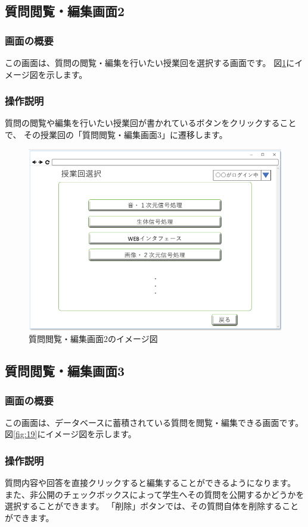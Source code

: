 \newpage

\subsection{質問閲覧・編集画面2}
\subsubsection{画面の概要}
この画面は、質問の閲覧・編集を行いたい授業回を選択する画面です。
図\ref{fig:18}にイメージ図を示します。

\subsubsection{操作説明}
質問の閲覧や編集を行いたい授業回が書かれているボタンをクリックすることで、
その授業回の「質問閲覧・編集画面3」に遷移します。

\begin{figure}[htbp]
  \begin{center}
    \includegraphics[width=0.7\linewidth,clip]{./img/18.png}
    \caption{質問閲覧・編集画面2のイメージ図}\label{fig:18}
  \end{center}
\end{figure}

\newpage

\subsection{質問閲覧・編集画面3}
\subsubsection{画面の概要}
この画面は、データベースに蓄積されている質問を閲覧・編集できる画面です。
図\ref{fig:19}にイメージ図を示します。

\subsubsection{操作説明}
質問内容や回答を直接クリックすると編集することができるようになります。
また、非公開のチェックボックスによって学生へその質問を公開するかどうかを選択することができます。
「削除」ボタンでは、その質問自体を削除することができます。

